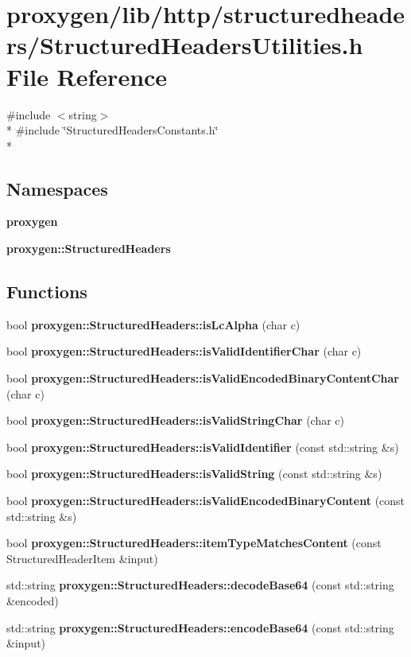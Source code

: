 \section{proxygen/lib/http/structuredheaders/\+Structured\+Headers\+Utilities.h File Reference}
\label{StructuredHeadersUtilities_8h}
{\ttfamily \#include $<$string$>$}\\*
{\ttfamily \#include \char`\"{}Structured\+Headers\+Constants.\+h\char`\"{}}\\*
\subsection*{Namespaces}
\begin{DoxyCompactItemize}
\item 
 {\bf proxygen}
\item 
 {\bf proxygen\+::\+Structured\+Headers}
\end{DoxyCompactItemize}
\subsection*{Functions}
\begin{DoxyCompactItemize}
\item 
bool {\bf proxygen\+::\+Structured\+Headers\+::is\+Lc\+Alpha} (char c)
\item 
bool {\bf proxygen\+::\+Structured\+Headers\+::is\+Valid\+Identifier\+Char} (char c)
\item 
bool {\bf proxygen\+::\+Structured\+Headers\+::is\+Valid\+Encoded\+Binary\+Content\+Char} (char c)
\item 
bool {\bf proxygen\+::\+Structured\+Headers\+::is\+Valid\+String\+Char} (char c)
\item 
bool {\bf proxygen\+::\+Structured\+Headers\+::is\+Valid\+Identifier} (const std\+::string \&s)
\item 
bool {\bf proxygen\+::\+Structured\+Headers\+::is\+Valid\+String} (const std\+::string \&s)
\item 
bool {\bf proxygen\+::\+Structured\+Headers\+::is\+Valid\+Encoded\+Binary\+Content} (const std\+::string \&s)
\item 
bool {\bf proxygen\+::\+Structured\+Headers\+::item\+Type\+Matches\+Content} (const Structured\+Header\+Item \&input)
\item 
std\+::string {\bf proxygen\+::\+Structured\+Headers\+::decode\+Base64} (const std\+::string \&encoded)
\item 
std\+::string {\bf proxygen\+::\+Structured\+Headers\+::encode\+Base64} (const std\+::string \&input)
\end{DoxyCompactItemize}
